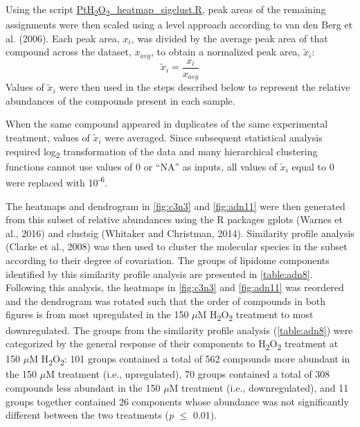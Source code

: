 Using the script \href{https://github.com/jamesrco/LipidomicsDataViz/blob/master/LOBSTAHS/PtH\textsubscript{2}O\textsubscript{2}_heatmap_sigclust.R}{PtH\textsubscript{2}O\textsubscript{2}\_heatmap\_sigclust.R}, peak areas of the remaining assignments were then scaled using a level approach according to van den Berg et al. (2006). Each peak area, ${x_i}$, was divided by the average peak area of that compound across the dataset, ${x_{avg}}$, to obtain a normalized peak area, ${\tilde x_i}$:
\begin{equation} \label{eq:adn1}
{\tilde x_i} = \frac{{{x_i}}}{{{x_{avg}}}}
\end{equation}
Values of ${\tilde x_i}$ were then used in the steps described below to represent the relative abundances of the compounds present in each sample.

When the same compound appeared in duplicates of the same experimental treatment, values of ${\tilde x_i}$ were averaged. Since subsequent statistical analysis required log\textsubscript{2} transformation of the data and many hierarchical clustering functions cannot use values of 0 or ``NA'' as inputs, all values of ${\tilde x_i}$ equal to 0 were replaced with 10\textsuperscript{-6}.

The heatmaps and dendrogram in \autoref{fig:c3n3} and \autoref{fig:adn11} were then generated from this subset of relative abundances using the R packages gplots (Warnes et al., 2016) and clustsig (Whitaker and Christman, 2014). Similarity profile analysis (Clarke et al., 2008) was then used to cluster the molecular species in the subset according to their degree of covariation. The groups of lipidome components identified by this similarity profile analysis are presented in \autoref{table:adn8}. Following this analysis, the heatmaps in \autoref{fig:c3n3} and \autoref{fig:adn11} was reordered and the dendrogram was rotated such that the order of compounds in both figures is from most upregulated in the 150 $\mu$M H\textsubscript{2}O\textsubscript{2} treatment to most downregulated. The groups from the similarity profile analysis (\autoref{table:adn8}) were categorized by the general response of their components to H\textsubscript{2}O\textsubscript{2} treatment at 150 $\mu$M H\textsubscript{2}O\textsubscript{2}: 101 groups contained a total of 562 compounds more abundant in the 150 $\mu$M treatment (i.e., upregulated), 70 groups contained a total of 308 compounds less abundant in the 150 $\mu$M treatment (i.e., downregulated), and 11 groups together contained 26 components whose abundance was not significantly different between the two treatments (\emph{p} $\leq$ 0.01).

